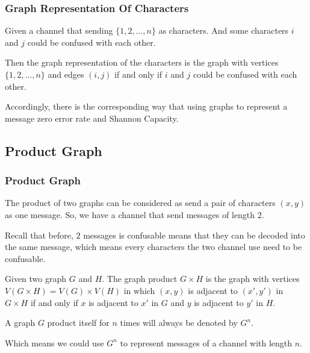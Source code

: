      \begin{frame}
            \frametitle{Graph Representation Of Characters}
            \begin{definition}\label{def:graphRepresetationOfChannel}
                  Given a channel that sending $\{1,2,\dots,n\}$ as characters. And some characters $i$ and $j$ could be confused with each other.

                  Then the graph representation of the characters is the graph with vertices $\{1,2,\dots,n\}$ and edges $(i,j)$ if and only if $i$ and $j$ could be confused with each other.
            \end{definition}

            Accordingly, there is the corresponding way that using graphs to represent a message zero error rate and Shannon Capacity.
      \end{frame}

\subsection*{Product Graph}

      \begin{frame}
            \frametitle{Product Graph}
            \begin{definition}\label{def:graphProduct}
                  The product of two graphs can be considered as send a pair of characters $(x,y)$ as one message. So, we have a channel that send messages of length $2$.

                  \pause

                  Recall that before, $2$ messages is confusable means that they can be decoded into the same message, which means every characters the two channel use need to be confusable.

                  Given two graph $ G $ and $ H $. The graph product $ G \times H $ is the graph with vertices $ V(G \times H) = V(G) \times V(H) $ in which $ (x,y) $ is adjacent to $ (x',y') $ in $ G \times H $ if and only if $ x $ is adjacent to $ x' $ in $ G $ and $ y $ is adjacent to $ y' $ in $ H $.
      
                  \pause

                  A graph $ G $ product itself for $ n $ times will always be denoted by $ G^n $.

                  Which means we could use $ G^n $ to represent messages of a channel with length $n$.
            \end{definition}
      \end{frame}

